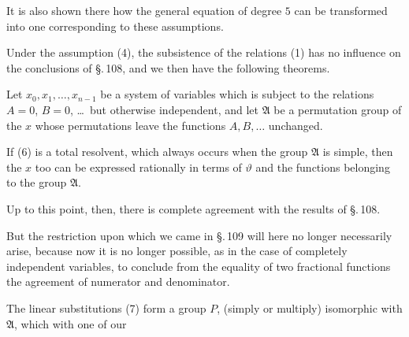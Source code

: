 It is also shown there how the general equation of degree $5$ can be transformed into one corresponding to these assumptions.

Under the assumption (4), the subsistence of the relations (1) has no influence on the conclusions of \S.\,108, and we then have the following theorems.

Let $x_0, x_1, \ldots, x_{n-1}$ be a system of variables which is subject to the relations $A=0$, $B=0$, \ldots\ but otherwise independent, and let $\mathfrak{A}$ be a permutation group of the $x$ whose permutations leave the functions $A, B, \ldots$ unchanged.


If (6) is a total resolvent, which always occurs when the group $\mathfrak{A}$ is simple, then the $x$ too can be expressed rationally in terms of $\vartheta$ and the functions belonging to the group $\mathfrak{A}$.

Up to this point, then, there is complete agreement with the results of \S.\,108.

But the restriction upon which we came in \S.\,109 will here no longer necessarily arise, because now it is no longer possible, as in the case of completely independent variables, to conclude from the equality of two fractional functions the agreement of numerator and denominator.

The linear substitutions (7) form a group $P$, (simply or multiply) isomorphic with $\mathfrak{A}$, which with one of our
